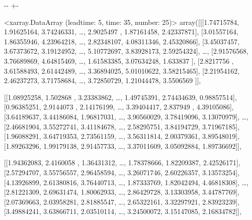 \documentclass[letterpaper,10pt,english]{sphinxmanual}
\newlength\nbsphinxcodecellspacing
\begin{document}
{

\kern-\sphinxverbatimsmallskipamount\kern-\baselineskip
\kern+\FrameHeightAdjust\kern-\fboxrule
\vspace{\nbsphinxcodecellspacing}

\begin{sphinxVerbatim}[commandchars=\\\{\}]
\llap{\color{nbsphinxout}[13]:\,\hspace{\fboxrule}\hspace{\fboxsep}}<xarray.DataArray (leadtime: 5, time: 35, number: 25)>
array([[[1.74715784, 1.91625164, 3.74246331, {\ldots}, 2.9025497 ,
         1.87161458, 2.42337871],
        [3.01557164, 1.86355946, 4.23964218, {\ldots}, 2.82348107,
         4.08311346, 2.45320866],
        [3.45037457, 3.67373672, 3.19124952, {\ldots}, 5.10772697,
         3.83928173, 2.59254324],
        {\ldots},
        [2.91576568, 3.76689869, 4.64815469, {\ldots}, 1.61583385,
         3.07634248, 1.633837  ],
        [2.8217756 , 3.61588493, 2.61442489, {\ldots}, 3.36894025,
         5.01010622, 3.58215465],
        [2.21954162, 2.46237273, 3.71758684, {\ldots}, 3.72850729,
         1.21044478, 3.5506569 ]],

       [[1.08925258, 1.502868  , 3.23383862, {\ldots}, 1.49745391,
         2.74434639, 0.98857514],
        [0.96385251, 2.9144073 , 2.14176199, {\ldots}, 3.39404417,
         2.837949  , 4.39105086],
        [3.64189637, 3.44186084, 1.96817031, {\ldots}, 3.90560029,
         3.78419096, 3.13070979],
        {\ldots},
        [2.46681904, 3.55272741, 3.41184678, {\ldots}, 2.58295751,
         3.84194729, 3.71967185],
        [1.96088291, 3.64719353, 2.73561159, {\ldots}, 3.56311814,
         2.00379361, 3.89548019],
        [1.89263296, 1.99179138, 2.91457733, {\ldots}, 3.37011609,
         3.05092884, 1.89736692]],

       [[1.94362083, 2.4160058 , 1.36431312, {\ldots}, 1.78378666,
         1.82209387, 2.42526171],
        [2.57294707, 3.55756557, 2.96458594, {\ldots}, 3.26071746,
         2.60226357, 3.13573254],
        [4.13926899, 2.61380816, 3.76440713, {\ldots}, 1.87333769,
         1.82042494, 4.46818308],
        {\ldots},
        [2.81221309, 2.69631474, 1.80062933, {\ldots}, 2.86429728,
         3.13303958, 3.44787769],
        [2.07369663, 2.03958281, 2.81885547, {\ldots}, 2.65322161,
         3.32297921, 2.83923239],
        [3.49884241, 3.63866711, 2.03510114, {\ldots}, 3.24500072,
         3.15147085, 2.16834782]],


\end{sphinxVerbatim}}
\end{document}
